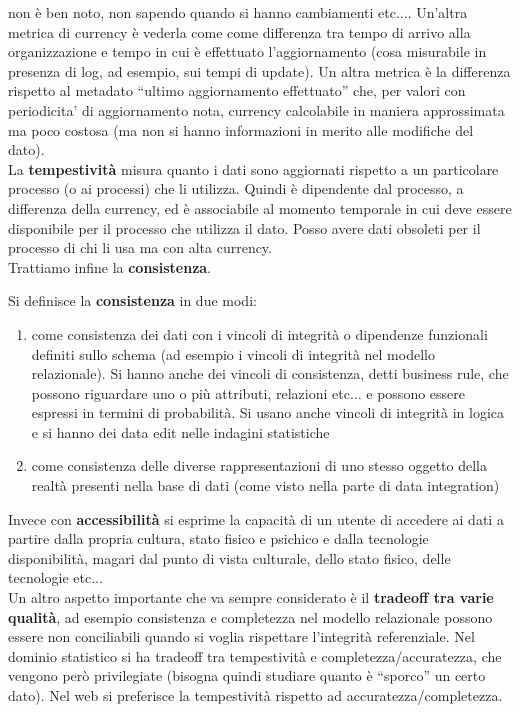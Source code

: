 \documentclass[a4paper,12pt, oneside]{book}
\begin{document}
non è ben noto, non sapendo quando si hanno cambiamenti etc$\ldots$. Un'altra
metrica di currency è vederla come come differenza tra tempo di arrivo alla
organizzazione e tempo in cui è effettuato l’aggiornamento (cosa misurabile in
presenza di log, ad esempio, sui tempi di update). Un altra metrica è la
differenza rispetto al metadato ``ultimo aggiornamento effettuato'' che, per
valori con periodicita’ di aggiornamento nota, currency calcolabile in maniera
approssimata ma poco costosa (ma non si hanno informazioni in merito alle
modifiche del dato). \\
La \textbf{tempestività} misura quanto i dati sono aggiornati rispetto a un
particolare processo (o ai processi) che li utilizza. Quindi è dipendente dal
processo, a differenza della currency, ed è associabile al momento temporale in
cui deve essere disponibile per il processo che utilizza il dato. Posso avere
dati obsoleti per il processo di chi li usa ma con alta currency.\\
Trattiamo infine la \textbf{consistenza}.\\
\begin{definizione}
  Si definisce la \textbf{consistenza} in due modi:
  \begin{enumerate}
    \item come consistenza dei dati con i vincoli di integrità o dipendenze
    funzionali definiti sullo schema (ad esempio i vincoli di integrità nel
    modello relazionale). Si hanno anche dei vincoli di consistenza, detti
    business rule, che possono riguardare uno o più attributi, relazioni
    etc$\ldots$ e possono essere espressi in termini di probabilità. Si usano
    anche vincoli di integrità in logica e si hanno dei data edit nelle indagini
    statistiche 
    \item come consistenza delle diverse rappresentazioni di uno stesso oggetto
    della realtà presenti nella base di dati (come visto nella parte di data
    integration)    
  \end{enumerate}
\end{definizione}
Invece con \textbf{accessibilità} si esprime la capacità di un utente di
accedere ai dati a partire dalla propria cultura, stato fisico e psichico e
dalla tecnologie disponibilità, magari dal punto di vista culturale, dello stato
fisico, delle tecnologie etc$\ldots$\\
Un altro aspetto importante che va sempre considerato è il \textbf{tradeoff tra
  varie qualità}, ad esempio consistenza e completezza nel modello relazionale
possono essere non conciliabili quando si voglia rispettare l'integrità
referenziale. Nel dominio statistico si ha tradeoff tra tempestività e
completezza/accuratezza, che vengono però privilegiate (bisogna quindi studiare
quanto è ``sporco'' un certo dato). Nel web si preferisce la tempestività
rispetto ad accuratezza/completezza.
\end{document}
